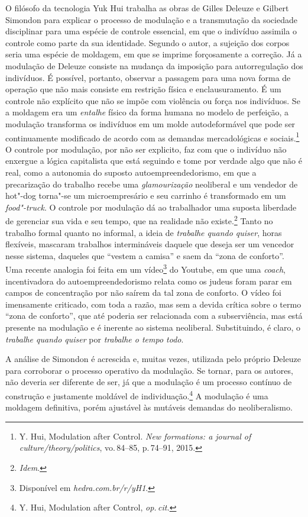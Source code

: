 O filósofo da tecnologia Yuk Hui trabalha as obras de Gilles
Deleuze e Gilbert Simondon para explicar o processo de modulação e a
transmutação da sociedade disciplinar para uma espécie de controle
essencial, em que o indivíduo assimila o controle como parte da sua
identidade. Segundo o autor, a sujeição dos corpos seria uma espécie de
moldagem, em que se imprime forçosamente a correção. Já a modulação
de Deleuze consiste na mudança da imposição para autorregulação dos
indivíduos. É possível, portanto, observar a passagem para uma nova
forma de operação que não mais consiste em restrição física e
enclausuramento. É um controle não explícito que não se impõe com
violência ou força nos indivíduos. Se a moldagem era um \textit{entalhe}
físico da forma humana no modelo de perfeição, a modulação transforma os
indivíduos em um molde autodeformável que pode ser continuamente
modificado de acordo com as demandas mercadológicas e sociais.\footnote{Y. Hui, Modulation after Control. \textit{New formations: a journal of
culture/theory/politics}, vo.\,84--85, p.\,74--91, 2015.} O controle por modulação, por não ser explicito, faz com que o
indivíduo não enxergue a lógica capitalista que está seguindo e tome por
verdade algo que não é real, como a autonomia do suposto
autoempreendedorismo, em que a precarização do trabalho recebe uma
\textit{glamourização} neoliberal e um vendedor de hot"-dog torna"-se um
microempresário e seu carrinho é transformado em um \textit{food"-truck}. O
controle por modulação dá ao trabalhador uma suposta liberdade de
gerenciar sua vida e seu tempo, que na realidade não existe.\footnote{\textit{Idem}.} Tanto no trabalho formal quanto no
informal, a ideia de \textit{trabalhe quando quiser}, horas
flexíveis, mascaram trabalhos intermináveis daquele que deseja ser um
vencedor nesse sistema, daqueles que ``vestem a camisa'' e saem
da ``zona de conforto''. Uma recente analogia foi feita em um
vídeo\footnote{Disponível em \textit{hedra.com.br/r/yH1}.} do Youtube, em que uma \textit{coach},
incentivadora do autoempreendedorismo relata como os judeus foram parar
em campos de concentração por não saírem da tal zona de conforto. O
vídeo foi imensamente criticado, com toda a razão, mas sem a devida
crítica sobre o termo ``zona de conforto'', que até poderia ser
relacionada com a subserviência, mas está presente na modulação e é
inerente ao sistema neoliberal. Substituindo, é claro, o \textit{trabalhe quando quiser} por \textit{trabalhe o tempo todo}.

A análise de Simondon é acrescida e, muitas vezes, utilizada pelo
próprio Deleuze para corroborar o processo operativo da modulação. Se
tornar, para os autores, não deveria ser diferente de ser, já que a
modulação é um processo contínuo de construção e justamente moldável de
individuação.\footnote{Y. Hui, Modulation after Control, \textit{op.\,cit.}} A modulação é uma moldagem definitiva,
porém ajustável às mutáveis demandas do neoliberalismo.


